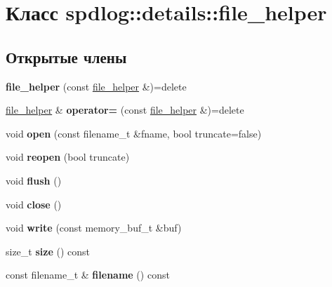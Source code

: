 \hypertarget{classspdlog_1_1details_1_1file__helper}{}\section{Класс spdlog\+:\+:details\+:\+:file\+\_\+helper}
\label{classspdlog_1_1details_1_1file__helper}
\subsection*{Открытые члены}
\begin{DoxyCompactItemize}
\item 
\mbox{\label{classspdlog_1_1details_1_1file__helper_ab68b7720555f7656a8f387f8e0dcb37d}} 
{\bfseries file\+\_\+helper} (const \hyperlink{classspdlog_1_1details_1_1file__helper}{file\+\_\+helper} \&)=delete
\item 
\mbox{\label{classspdlog_1_1details_1_1file__helper_a7c7314360e404efa02326feb7aa98442}} 
\hyperlink{classspdlog_1_1details_1_1file__helper}{file\+\_\+helper} \& {\bfseries operator=} (const \hyperlink{classspdlog_1_1details_1_1file__helper}{file\+\_\+helper} \&)=delete
\item 
\mbox{\label{classspdlog_1_1details_1_1file__helper_aecf4df8af7f7bd49ce59986d412ce74a}} 
void {\bfseries open} (const filename\+\_\+t \&fname, bool truncate=false)
\item 
\mbox{\label{classspdlog_1_1details_1_1file__helper_a414172c77533a3b31e96af33afb5ed16}} 
void {\bfseries reopen} (bool truncate)
\item 
\mbox{\label{classspdlog_1_1details_1_1file__helper_a457bfb2e4f85cd593cb4708909f9591e}} 
void {\bfseries flush} ()
\item 
\mbox{\label{classspdlog_1_1details_1_1file__helper_ae6fbd8dfff6be4433befee5dffec739b}} 
void {\bfseries close} ()
\item 
\mbox{\label{classspdlog_1_1details_1_1file__helper_a499a3174f627b9a4749fc592fc9f52c1}} 
void {\bfseries write} (const memory\+\_\+buf\+\_\+t \&buf)
\item 
\mbox{\label{classspdlog_1_1details_1_1file__helper_a3811a1dab9dee7435b60eb474d2cc347}} 
size\+\_\+t {\bfseries size} () const
\item 
\mbox{\label{classspdlog_1_1details_1_1file__helper_a0a68a8681c1f8baca0c4e8c4176085dd}} 
const filename\+\_\+t \& {\bfseries filename} () const
\end{DoxyCompactItemize}
